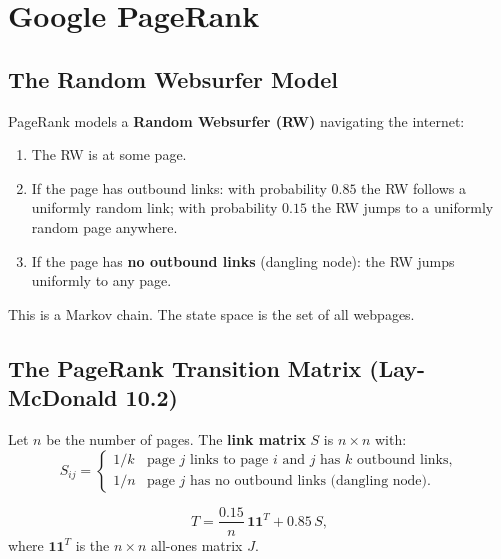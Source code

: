 \chapter{Google PageRank}

\section{The Random Websurfer Model}

PageRank models a \textbf{Random Websurfer (RW)} navigating the internet:
\begin{enumerate}
  \item The RW is at some page.
  \item If the page has outbound links: with probability $0.85$ the RW follows a uniformly random link; with probability $0.15$ the RW jumps to a uniformly random page anywhere.
  \item If the page has \textbf{no outbound links} (dangling node): the RW jumps uniformly to any page.
\end{enumerate}

This is a Markov chain. The state space is the set of all webpages.

\section{The PageRank Transition Matrix (Lay-McDonald 10.2)}

\begin{definition}
Let $n$ be the number of pages. The \textbf{link matrix} $S$ is $n\times n$ with:
\[
  S_{ij} = \begin{cases}
    1/k & \text{page } j \text{ links to page } i \text{ and } j \text{ has } k \text{ outbound links},\\
    1/n & \text{page } j \text{ has no outbound links (dangling node)}.
  \end{cases}
\]
\end{definition}

\begin{definition}
\[
  T = \frac{0.15}{n}\,\mathbf{1}\mathbf{1}^T + 0.85\, S,
\]
where $\mathbf{1}\mathbf{1}^T$ is the $n\times n$ all-ones matrix $J$.
\end{definition}

